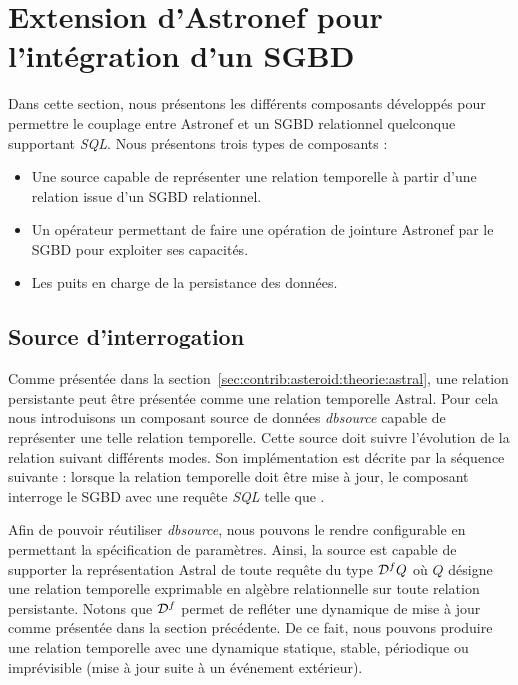 \section{Extension d'Astronef pour l'intégration d'un SGBD}\label{sec:contrib:asteroid:composants}
Dans cette section, nous présentons les différents composants développés pour permettre le couplage entre Astronef et un SGBD relationnel quelconque supportant \textit{SQL}. Nous présentons trois types de composants :
\begin{itemize}
	\item Une source capable de représenter une relation temporelle à partir d'une relation issue d'un SGBD relationnel. 
	\item Un opérateur permettant de faire une opération de jointure Astronef par le SGBD pour exploiter ses capacités. 
	\item Les puits en charge de la persistance des données.
\end{itemize}

\subsection{Source d'interrogation}
Comme présentée dans la section~\ref{sec:contrib:asteroid:theorie:astral}, une relation persistante peut être présentée comme une relation temporelle Astral. Pour cela nous introduisons un composant source de données \textit{dbsource} capable de représenter une telle relation temporelle. Cette source doit suivre l'évolution de la relation suivant différents modes. Son implémentation est décrite par la séquence suivante : lorsque la relation temporelle doit être mise à jour, le composant interroge le SGBD avec une requête \textit{SQL} telle que .

Afin de pouvoir réutiliser \textit{dbsource}, nous pouvons le rendre configurable en permettant la spécification de paramètres. Ainsi, la source est capable de supporter la représentation Astral de toute requête du type $\mathcal{D}^f Q$ où $Q$ désigne une relation temporelle exprimable en algèbre relationnelle sur toute relation persistante. Notons que $\mathcal{D}^f$ permet de refléter une dynamique de mise à jour comme présentée dans la section précédente. De ce fait, nous pouvons produire une relation temporelle avec une dynamique statique, stable, périodique ou imprévisible (mise à jour suite à un événement extérieur).

